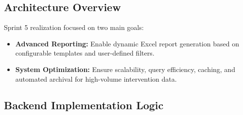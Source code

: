 \subsection{Architecture Overview}

Sprint 5 realization focused on two main goals:

\begin{itemize}
\item \textbf{Advanced Reporting:} Enable dynamic Excel report generation based on configurable templates and user-defined filters.
\item \textbf{System Optimization:} Ensure scalability, query efficiency, caching, and automated archival for high-volume intervention data.
\end{itemize}


\subsection{Backend Implementation Logic}


